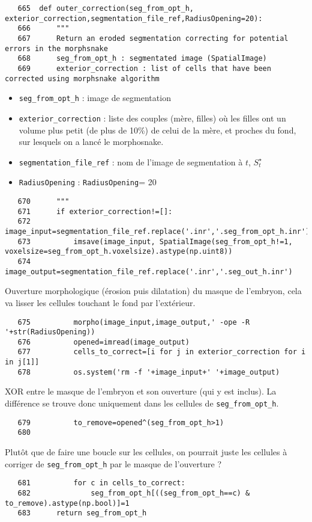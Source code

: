 \documentclass{article}
\def \mycolor {red}
\begin{document}
\begin{verbatim}
   665	def outer_correction(seg_from_opt_h, exterior_correction,segmentation_file_ref,RadiusOpening=20):
   666	    """
   667	    Return an eroded segmentation correcting for potential errors in the morphsnake
   668	    seg_from_opt_h : segmentated image (SpatialImage)
   669	    exterior_correction : list of cells that have been corrected using morphsnake algorithm
\end{verbatim}
\color{\mycolor}
\begin{itemize}
\itemsep -1ex
\item \verb|seg_from_opt_h| : image de segmentation
\item \verb|exterior_correction| : liste des couples (m\`ere, filles) o\`u les filles ont un volume plus petit (de plus de 10\%) de celui de la m\`ere, et proches du fond, sur lesquels on a lanc\'e le morphosnake.
\item \verb|segmentation_file_ref| : nom de l'image de segmentation \`a $t$, $S^{\star}_t$
\item \verb|RadiusOpening| : \verb|RadiusOpening|= 20
\end{itemize}
\color{black}
\begin{verbatim}
   670	    """
   671	    if exterior_correction!=[]:
   672	    	image_input=segmentation_file_ref.replace('.inr','.seg_from_opt_h.inr')
   673	        imsave(image_input, SpatialImage(seg_from_opt_h!=1, voxelsize=seg_from_opt_h.voxelsize).astype(np.uint8))
   674	        image_output=segmentation_file_ref.replace('.inr','.seg_out_h.inr')
\end{verbatim}
\color{\mycolor}
Ouverture morphologique (\'erosion puis dilatation) du masque de l'embryon, cela va lisser les cellules touchant le fond par l'ext\'erieur.
\color{black}
\begin{verbatim}
   675	        morpho(image_input,image_output,' -ope -R '+str(RadiusOpening))
   676	        opened=imread(image_output)
   677	        cells_to_correct=[i for j in exterior_correction for i in j[1]]
   678	        os.system('rm -f '+image_input+' '+image_output)
\end{verbatim}
\color{\mycolor}
XOR entre le masque de l'embryon et son ouverture (qui y est inclus). La diff\'erence se trouve donc uniquement dans les cellules de \verb|seg_from_opt_h|.
\color{black}
\begin{verbatim}
   679	        to_remove=opened^(seg_from_opt_h>1)
   680	        
\end{verbatim}
\color{\mycolor}
Plut\^ot que de faire une boucle sur les cellules, on pourrait juste les cellules \`a corriger de \verb|seg_from_opt_h| par le masque de l'ouverture ?
\color{black}
\begin{verbatim}
   681	        for c in cells_to_correct:
   682	            seg_from_opt_h[((seg_from_opt_h==c) & to_remove).astype(np.bool)]=1
   683	    return seg_from_opt_h
\end{verbatim}
\end{document}
